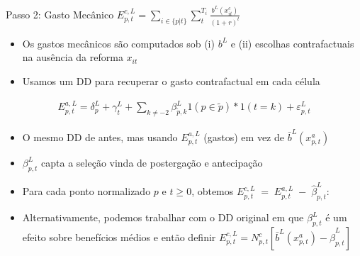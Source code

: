 \begin{frame}{Passo 2: Gasto Mecânico $E^{c,L}_{p,t}=\sum_{i \in \{p|t\}} \sum_t^{T_i} \frac{b^L(x^c_{it})}{(1+r)^t}$}
\begin{itemize}
    \item {Os gastos mecânicos são computados sob (i) $b^L$ e (ii) escolhas contrafactuais na ausência da reforma $x_{it}$}
    
    \item {Usamos um DD para recuperar o gasto contrafactual em cada célula}
\end{itemize}    
    \begin{align*}
        {E^{a,L}_{p,t}=\delta_{p}^{L}+\gamma_t^{L} +\sum_{k\neq -2}\beta_{\tilde{p},k}^{L} 1(p\in \tilde p)*1(t=k)+\varepsilon_{p,t}^{L}}
    \end{align*}
\begin{itemize}    
    \item {O mesmo DD de antes, mas usando $E^{a,L}_{p,t}$ (gastos) em vez de $\bar b^{L}(x^a_{p,t})$}
    
    \item {$\beta^{L}_{p,t}$ capta a seleção vinda de postergação e antecipação}
    
    \item {Para cada ponto normalizado $p$ e $t\geq 0$, obtemos $E^{c,L}_{p,t}
        \;=\;
        E^{a,L}_{p,t}
        \;-\;
        \hat \beta^{L}_{p,t}$:}
    \item {Alternativamente, podemos trabalhar com o DD original em que $\beta^{L}_{p,t}$ é um efeito sobre benefícios médios e então definir $E^{c,L}_{p,t}=N^{c}_{p,t}[\bar b^L(x^a_{p,t})-\hat \beta^{L}_{p,t}]$}
\end{itemize}
\end{frame}


